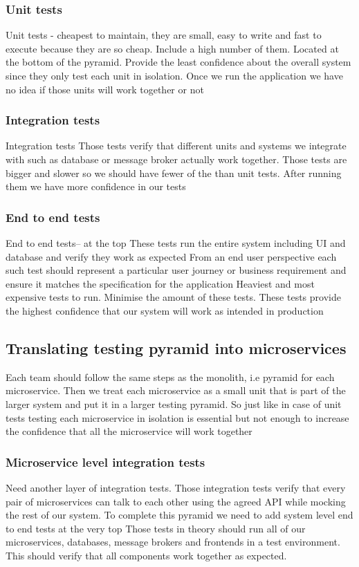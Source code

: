 \documentclass[a4paper, 11pt]{book}
\begin{document}
    \subsubsection{Unit tests}
    Unit tests - cheapest to maintain, they are small, easy to write and fast to execute because they are so cheap.
    Include a high number of them.
    Located at the bottom of the pyramid.
    Provide the least confidence about the overall system since they only test each unit in isolation.
    Once we run the application we have no idea if those units will work together or not

    \subsubsection{Integration tests}
    Integration tests
    Those tests verify that different units and systems we integrate with such as database or message broker actually work together.
    Those tests are bigger and slower so we should have fewer of the than unit tests.
    After running them we have more confidence in our tests

    \subsubsection{End to end tests}
    End to end tests-- at the top
    These tests run the entire system including UI and database and verify they work as expected
    From an end user perspective each such test should represent a particular user journey or business requirement and ensure it matches the specification for the application
    Heaviest and most expensive tests to run.
    Minimise the amount of these tests.
    These tests provide the highest confidence that our system will work as intended in production

    \subsection{Translating testing pyramid into microservices}
    Each team should follow the same steps as the monolith, i.e pyramid for each microservice.
    Then we treat each microservice as a small unit that is part of the larger system and put it in a larger testing pyramid.
    So just like in case of unit tests testing each microservice in isolation is essential but not enough to increase the confidence that all the microservice will work together

    \subsubsection{Microservice level integration tests}
    Need another layer of integration tests.
    Those integration tests verify that every pair of microservices can talk to each other using the agreed API while mocking the rest of our system.
    To complete this pyramid we need to add system level end to end tests at the very top
    Those tests in theory should run all of our microservices, databases, message brokers and frontends in a test environment.
    This should verify that all components work together as expected.
\end{document}
